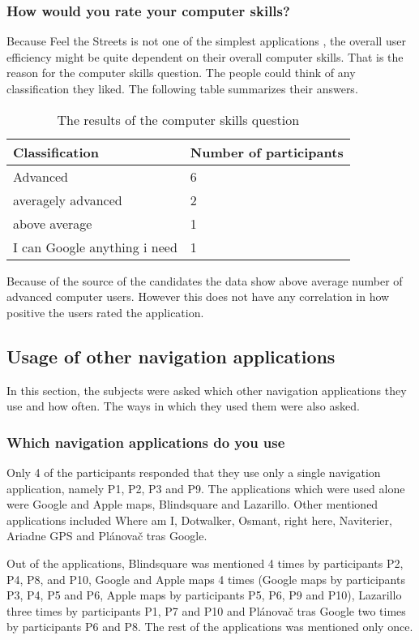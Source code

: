 \documentclass[nolof,digital]{fithesis3}
\begin{document}
\subsubsection{How would you rate your computer skills?}
Because Feel the Streets is not one of the simplest applications , the overall user efficiency might be quite dependent on their overall computer skills. That is the reason for the computer skills question. The people could think of any classification they liked. The following table summarizes their answers.
\begin{table}
\caption{The results of the computer skills question}
\begin{tabularx}{\textwidth}{ |X|X| }
Classification & Number of participants \\
\hline
Advanced & 6 \\
averagely advanced & 2 \\
above average & 1 \\
I can Google anything i need & 1 \\
\end{tabularx}
\end{table}
Because of the source of the candidates the data show above average number of advanced computer users. However this does not have any correlation in how positive the users rated the application.
\subsection{Usage of other navigation applications}
In this section, the subjects were asked which other navigation applications they use and how often. The ways in which they used them were also asked.
\subsubsection{Which navigation applications do you use}
Only 4 of the participants responded that they use only a single navigation application, namely P1, P2, P3 and P9. The applications which were used alone were Google and Apple maps, Blindsquare and Lazarillo. Other mentioned applications included Where am I, Dotwalker, Osmant, right here, Naviterier, Ariadne GPS and Plánovač tras Google.

Out of the applications, Blindsquare was mentioned 4 times by participants P2, P4, P8, and P10, Google and Apple maps 4 times (Google maps by participants P3, P4, P5 and P6, Apple maps by participants P5, P6, P9 and P10), Lazarillo three times by participants P1, P7 and P10 and Plánovač tras Google two times by participants P6 and P8. The rest of the applications was mentioned only once.
\end{document}
